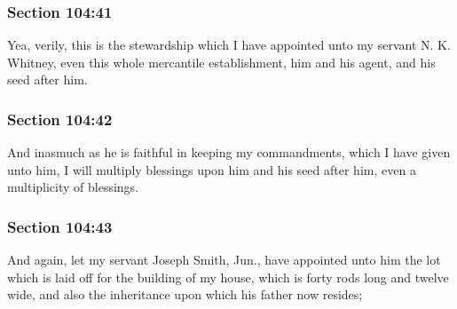 	\subsubsection{Section 104:41} %
		\label{DC104-41}

		Yea, verily, this is the stewardship which I have appointed unto my servant N. K. Whitney, even this whole mercantile establishment, him and his agent, and his seed after him.


	\subsubsection{Section 104:42} %
		\label{DC104-42}

		And inasmuch as he is faithful in keeping my commandments, which I have given unto him, I will multiply blessings upon him and his seed after him, even a multiplicity of blessings.


	\subsubsection{Section 104:43} %
		\label{DC104-43}

		And again, let my servant Joseph Smith, Jun., have appointed unto him the lot which is laid off for the building of my house, which is forty rods long and twelve wide, and also the inheritance upon which his father now resides;


